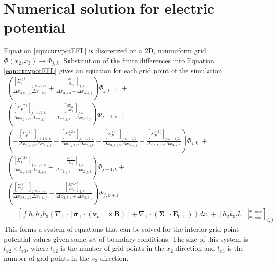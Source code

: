 \documentclass[11pt,letterpaper]{article}
\begin{document}


\section{Numerical solution for electric potential}

Equation \ref{eqn:curvpotEFL} is discretized on a 2D, nonuniform grid $\Phi(x_2,x_3) \rightarrow \Phi_{j,k}$.   Substitution of the finite differences into Equation \ref{eqn:curvpotEFL} gives an equation for each grid point of the simulation.
\begin{eqnarray}
 \left( \frac{ \left[ \Sigma_P^{(3)} \right]_{j,k-1/2}}{\Delta x_{3,k,1/2} \Delta x_{3,k,b}} + \frac{ \left[ \frac{\partial \Sigma_H'}{\partial x_2} \right]_{j,k}}{\Delta x_{3,k,b} + \Delta x_{3,k,f}} \right) \Phi_{j,k-1} ~ + &~& \nonumber \\
 \left( \frac{ \left[ \Sigma_P^{(2)} \right]_{j-1/2,k} }{\Delta x_{2,j,1/2} \Delta x_{2,j,b}} - \frac{ \left[ \frac{\partial \Sigma_H'}{\partial x_3} \right]_{j,k}}{\Delta x_{2,j,b} + \Delta x_{2,j,f}}\right) \Phi_{j-1,k} ~ + &~& \nonumber \\
 \left( - \frac{ \left[ \Sigma_P^{(2)} \right]_{j+1/2,k}} {\Delta x_{2,j,1/2} \Delta x_{2,j,f}} - \frac{ \left[ \Sigma_P^{(2)}\right]_{j-1/2,k} }{\Delta x_{2,j,1/2} \Delta x_{2,j,b}} - \frac{ \left[ \Sigma_P^{(3)} \right]_{j,k+1/2}} {\Delta x_{3,k,1/2} \Delta x_{3,k,f}} - \frac{ \left[ \Sigma_P^{(3)}\right]_{j,k-1/2} }{\Delta x_{3,k,1/2} \Delta x_{3,k,b}}  \right) \Phi_{j,k} ~ + &~& \nonumber \\
 \left( \frac{ \left[ \Sigma_P^{(2)} \right]_{j+1/2,k} }{\Delta x_{2,j,1/2} \Delta x_{2,j,f}} + \frac{\left[ \frac{\partial \Sigma_H'}{\partial x_3} \right]_{j,k}}{\Delta x_{2,j,b} + \Delta x_{2,j,f} }\right) \Phi_{j+1,k} + &~& \nonumber \\
 \left( \frac{ \left[ \Sigma_P^{(3)} \right]_{j,k+1/2}}{\Delta x_{3,k,1/2} \Delta x_{3,k,f}} - \frac{ \left[ \frac{\partial \Sigma_H'}{\partial x_2} \right]_{j,k}}{\Delta x_{3,k,b} + \Delta x_{3,k,f}} \right) \Phi_{j,k+1} ~ &~& \nonumber \\ 
 ~ = \left[ \int h_1 h_2 h_3 \left\{ \nabla_\perp \cdot \left[ \boldsymbol{\sigma}_\perp \cdot \left( \mathbf{v}_{n\perp} \times \mathbf{B} \right) \right] + \nabla_\perp \cdot \left( \boldsymbol{\Sigma}_\perp \cdot \mathbf{E}_{0\perp} \right) \right\} d x_1 + \left[ h_2 h_3 J_1 \right] \left|^{x_{1,max}}_{x_{1,min}} \right. \right]_{i,j}
\label{eqn:FDE}
\end{eqnarray}
This forms a system of equations that can be solved for the interior grid point potential values given some set of boundary conditions.  The size of this system is $l_{x2} \times l_{x3}$, where $l_{x2}$ is the number of grid points in the $x_2$-direction and $l_{x3}$ is the number of grid points in the $x_3$-direction.
\end{document}
